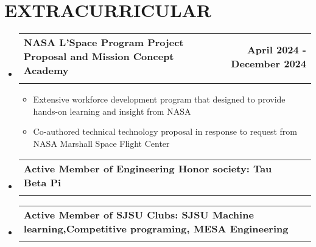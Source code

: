 \documentclass[letterpaper,11pt]{article}
\makeatletter
\newcommand{\resumeItem}[1]{
  \item\small{
    {#1 \vspace{-2pt}}
  }
}
\newcommand{\resumeSubheading}[4]{
  \vspace{-2pt}\item
    \begin{tabular*}{1.0\textwidth}[t]{l@{\extracolsep{\fill}}r}
      \textbf{#1} & \textbf{\small #2} \\
      {\small#3} & {\small #4} \\
    \end{tabular*}\vspace{-7pt}
}
\newcommand{\resumeSubHeadingListStart}{\begin{itemize}[leftmargin=0.0in, label={}]}
\newcommand{\resumeSubHeadingListEnd}{\end{itemize}}
\newcommand{\resumeItemListStart}{\begin{itemize}}
\newcommand{\resumeItemListEnd}{\end{itemize}\vspace{-5pt}}
\makeatother
\begin{document}
\section{EXTRACURRICULAR}
    \resumeSubHeadingListStart
      \resumeSubheading{NASA L'Space Program Project Proposal and Mission Concept Academy }{April 2024 - December 2024}{}{}\vspace{-16pt}
      \resumeItemListStart
      \resumeItem{Extensive workforce development program that designed to provide hands-on learning and insight from NASA }
        \resumeItem{Co-authored technical technology proposal in response to request from NASA Marshall Space Flight Center}
        \resumeItemListEnd
      \resumeSubheading{Active Member of Engineering Honor society: Tau Beta Pi}{}{}{}\vspace{-16pt}
        \resumeSubheading{Active Member of SJSU Clubs: SJSU Machine learning,Competitive programing, MESA Engineering }{}{}{}
        \resumeSubHeadingListEnd

\end{document}
